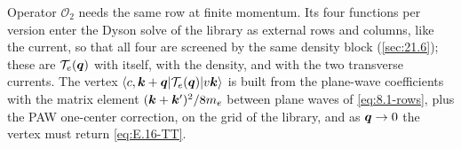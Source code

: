 Operator $\mathcal{O}_2$ needs the same row at finite momentum. Its four functions per version enter the Dyson solve of the library as external rows and columns, like the current, so that all four are screened by the same density block (\cref{sec:21.6}); these are $\mathcal{T}_e(\bm{q})$ with itself, with the density, and with the two transverse currents. The vertex $\langle c,\bm{k}+\bm{q}|\mathcal{T}_e(\bm{q})|v\bm{k}\rangle$ is built from the plane-wave coefficients with the matrix element $(\bm{k}+\bm{k}')^2/8m_e$ between plane waves of \cref{eq:8.1-rows}, plus the PAW one-center correction, on the grid of the library, and as $\bm{q}\to0$ the vertex must return \cref{eq:E.16-TT}.
